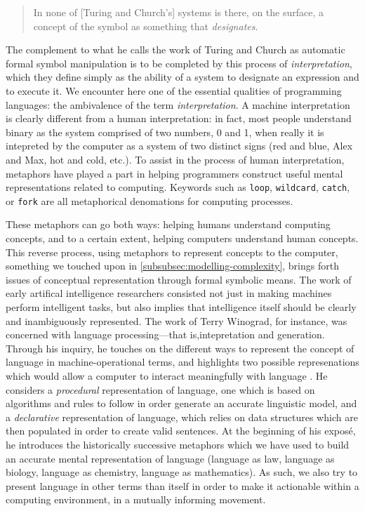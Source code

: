 \begin{quote}
    In none of [Turing and Church's] systems is there, on the surface, a concept of the symbol as something that \emph{designates}.
\end{quote}

The complement to what he calls the work of Turing and Church as automatic formal symbol manipulation is to be completed by this process of \emph{interpretation}, which they define simply as the ability of a system to designate an expression and to execute it. We encounter here one of the essential qualities of programming languages: the ambivalence of the term \emph{interpretation}. A machine interpretation is clearly different from a human interpretation: in fact, most people understand binary as the system comprised of two numbers, 0 and 1, when really it is intepreted by the computer as a system of two distinct signs (red and blue, Alex and Max, hot and cold, etc.). To assist in the process of human interpretation, metaphors have played a part in helping programmers construct useful mental representations related to computing. Keywords such as \lstinline{loop}, \lstinline{wildcard}, \lstinline{catch}, or \lstinline{fork} are all metaphorical denomations for computing processes.

These metaphors can go both ways: helping humans understand computing concepts, and to a certain extent, helping computers understand human concepts. This reverse process, using metaphors to represent concepts to the computer, something we touched upon in \ref{subsubsec:modelling-complexity}, brings forth issues of conceptual representation through formal symbolic means. The work of early artifical intelligence researchers consisted not just in making machines perform intelligent tasks, but also implies that intelligence itself should be clearly and inambiguously represented. The work of Terry Winograd, for instance, was concerned with language processing—that is,intepretation and generation. Through his inquiry, he touches on the different ways to represent the concept of language in machine-operational terms, and highlights two possible represenations which would allow a computer to interact meaningfully with language  \citep{winograd_language_1982}. He considers a \emph{procedural} representation of language, one which is based on algorithms and rules to follow in order generate an accurate linguistic model, and a \emph{declarative} representation of language, which relies on data structures which are then populated in order to create valid sentences. At the beginning of his exposé, he introduces the historically successive metaphors which we have used to build an accurate mental representation of language (language as law, language as biology, language as chemistry, language as mathematics). As such, we also try to present language in other terms than itself in order to make it actionable within a computing environment, in a mutually informing movement.

